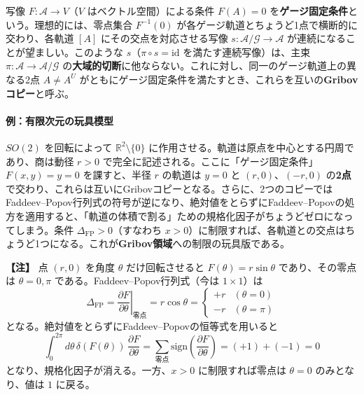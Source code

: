 \documentclass[uplatex, dvipdfmx, book]{jsbook}
\newenvironment{note}{\vspace{1ex}\par\footnotesize\noindent\textbf{【注】}}{\par\vspace{1ex}}
\begin{document}
写像 $F: \mathcal{A} \to V$（$V$ はベクトル空間）による条件 $F(A) = 0$ を\textbf{ゲージ固定条件}という。理想的には、零点集合 $F^{-1}(0)$ が各ゲージ軌道とちょうど1点で横断的に交わり、各軌道 $[A]$ にその交点を対応させる写像 $s: \mathcal{A}/\mathcal{G} \to \mathcal{A}$ が連続になることが望ましい。このような $s$（$\pi \circ s = \mathrm{id}$ を満たす連続写像）は、主束 $\pi: \mathcal{A} \to \mathcal{A}/\mathcal{G}$ の\textbf{大域的切断}に他ならない。これに対し、同一のゲージ軌道上の異なる2点 $A \neq A^U$ がともにゲージ固定条件を満たすとき、これらを互いの\textbf{Gribovコピー}と呼ぶ。

\paragraph{例：有限次元の玩具模型}
$SO(2)$ を回転によって $\mathbb{R}^2 \setminus \{0\}$ に作用させる。軌道は原点を中心とする円周であり、商は動径 $r > 0$ で完全に記述される。ここに「ゲージ固定条件」$F(x, y) = y = 0$ を課すと、半径 $r$ の軌道は $y = 0$ と $(r, 0)$、$(-r, 0)$ の\textbf{2点}で交わり、これらは互いにGribovコピーとなる。さらに、2つのコピーではFaddeev--Popov行列式の符号が逆になり、絶対値をとらずにFaddeev--Popovの処方を適用すると、「軌道の体積で割る」ための規格化因子がちょうどゼロになってしまう。条件 $\Delta_{\mathrm{FP}} > 0$（すなわち $x > 0$）に制限すれば、各軌道との交点はちょうど1つになる。これが\textbf{Gribov領域}への制限の玩具版である。

\begin{note}
点 $(r, 0)$ を角度 $\theta$ だけ回転させると $F(\theta) = r\sin\theta$ であり、その零点は $\theta = 0, \pi$ である。Faddeev--Popov行列式（今は $1 \times 1$）は
\begin{equation*}
    \Delta_{\mathrm{FP}} = \left.\frac{\partial F}{\partial \theta}\right|_{\text{零点}} = r\cos\theta = \begin{cases} +r & (\theta = 0) \\ -r & (\theta = \pi) \end{cases}
\end{equation*}
となる。絶対値をとらずにFaddeev--Popovの恒等式を用いると
\begin{equation*}
    \int_0^{2\pi} d\theta\, \delta(F(\theta))\, \frac{\partial F}{\partial \theta} = \sum_{\text{零点}} \mathrm{sign}\left(\frac{\partial F}{\partial \theta}\right) = (+1) + (-1) = 0
\end{equation*}
となり、規格化因子が消える。一方、$x > 0$ に制限すれば零点は $\theta = 0$ のみとなり、値は $1$ に戻る。
\end{note}
\end{document}
